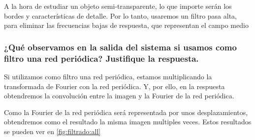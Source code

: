 \documentclass{./packages/optica-article}
\begin{document}
A la hora de estudiar un objeto semi-transparente, lo que importe serán los bordes y características de detalle. Por lo tanto, usaremos un filtro pasa alta, para eliminar las frecuencias bajas de respuesta, que representan el campo medio


\subsubsection{¿Qué observamos en la salida del sistema si usamos como filtro una red periódica? Justifique la respuesta.}
Si utilizamos como filtro una red periódica, estamos multiplicando la transformada de Fourier con la red periódica. Y, por ello, en la respuesta obtendremos la convolución entre la imagen y la Fourier de la red periódica.

Como la Fourier de la red periódica será representada por unos desplazamientos, obtendremos como el resultado la misma imagen multiples veces. Estos resultados se pueden ver en \ref{fig:filtrado:all}
\end{document}
